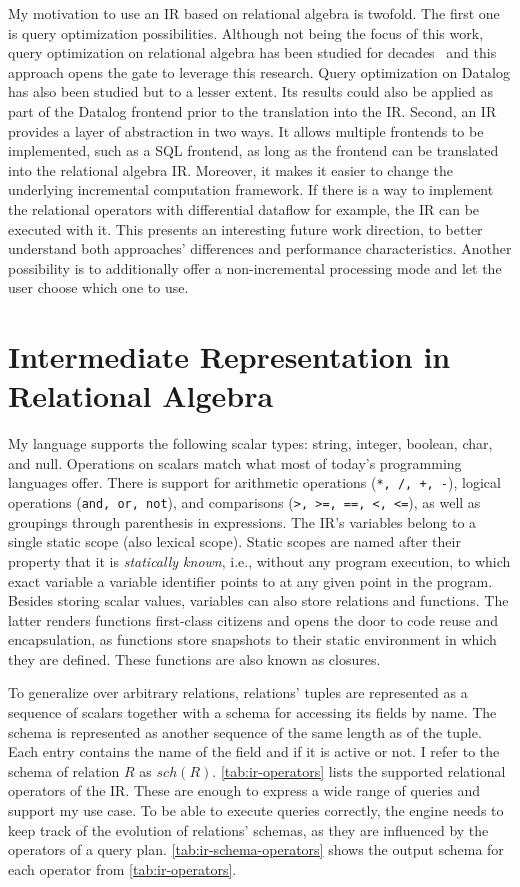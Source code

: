 My motivation to use an \ac{IR} based on relational algebra is twofold.
The first one is query optimization possibilities.
Although not being the focus of this work, query optimization on relational
algebra has been studied for decades~\cite{selinger1979access} and this approach
opens the gate to leverage this research.
Query optimization on Datalog has also been studied but to a lesser extent.
Its results could also be applied as part of the Datalog frontend prior to the
translation into the \ac{IR}.
Second, an \ac{IR} provides a layer of abstraction in two ways.
It allows multiple frontends to be implemented, such as a SQL frontend,
as long as the frontend can be translated into the relational algebra \ac{IR}.
Moreover, it makes it easier to change the underlying incremental computation
framework.
If there is a way to implement the relational operators with differential
dataflow for example, the \ac{IR} can be executed with it.
This presents an interesting future work direction, to better understand
both approaches' differences and performance characteristics.
Another possibility is to additionally offer a non-incremental processing mode
and let the user choose which one to use.

\section{Intermediate Representation in Relational Algebra}\label{sec:ir}

My language supports the following scalar types: string, integer, boolean, char,
and null.
Operations on scalars match what most of today's programming languages offer.
There is support for arithmetic operations (\texttt{*, /, +, -}),
logical operations (\texttt{and, or, not}),
and comparisons (\texttt{>, >=, ==, <, <=}),
as well as groupings through parenthesis in expressions.
The \ac{IR}'s variables belong to a single static scope (also lexical scope).
Static scopes are named after their property that it is \emph{statically known},
i.e., without any program execution, to which exact variable a
variable identifier points to at any given point in the program.
Besides storing scalar values, variables can also store relations and functions.
The latter renders functions first-class citizens and opens the door to
code reuse and encapsulation, as functions store snapshots to their static
environment in which they are defined.
These functions are also known as closures.

To generalize over arbitrary relations, relations' tuples are represented as
a sequence of scalars together with a schema for accessing its fields by name.
The schema is represented as another sequence of the same length as of the tuple.
Each entry contains the name of the field and if it is active or not.
I refer to the schema of relation \(R\) as \(\mathit{sch}(R)\).
\ref{tab:ir-operators} lists the supported relational operators of the \ac{IR}.
These are enough to express a wide range of queries and support my use case.
To be able to execute queries correctly, the engine needs to keep track of
the evolution of relations' schemas, as they are influenced by the operators
of a query plan.
\ref{tab:ir-schema-operators} shows the output schema for each operator from
\ref{tab:ir-operators}.

